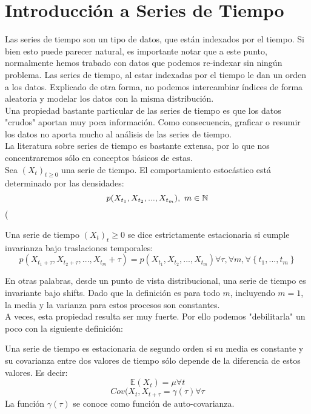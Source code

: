 \chapter{Introducción a Series de Tiempo}

Las series de tiempo son un tipo de datos, que están indexados por el tiempo. Si bien esto puede parecer natural, es importante notar que a este punto, normalmente hemos trabado con datos que podemos re-indexar sin ningún problema. Las series de tiempo, al estar indexadas por el tiempo le dan un orden a los datos. Explicado de otra forma, no podemos intercambiar índices de forma aleatoria y modelar los datos con la misma distribución. \\
Una propiedad bastante particular de las series de tiempo es que los datos "crudos" aportan muy poca información. Como consecuencia, graficar o resumir los datos no aporta mucho al análisis de las series de tiempo. \\
La literatura sobre series de tiempo es bastante extensa, por lo que nos concentraremos sólo en conceptos básicos de estas. \\
Sea $(X_t)_{t \geq 0}$ una serie de tiempo. El comportamiento estocástico está determinado por las densidades: 
$$
p(X_{t_1},X_{t_2},...,X_{t_m}), \text{  } m \in {\mathbb N}
$$
(\begin{definition}
Una serie de tiempo $(X_t)_t\geq 0$ se dice estrictamente estacionaria si cumple invarianza bajo traslaciones temporales:
$$
p(X_{t_1+\tau},X_{t_2+\tau},...,X_{t_m}+\tau)=p(X_{t_1},X_{t_2},...,X_{t_m}) \forall \tau, \forall m, \forall \left \{ t_1,...,t_m \right \}
$$
\end{definition}

En otras palabras, desde un punto de vista distribucional, una serie de tiempo es invariante bajo shifts. Dado que la definición es para todo $m$, incluyendo $m=1$, la media y la varianza para estos procesos son constantes. \\
A veces, esta propiedad resulta ser muy fuerte. Por ello podemos "debilitarla" un poco con la siguiente definición: 
 \begin{definition}
 Una serie de tiempo es estacionaria de segundo orden si su media es constante y su covarianza entre dos valores de tiempo sólo depende de la diferencia de estos valores. Es decir:
 $$
 \mathbb{E}(X_t)=\mu \forall t
 $$
 $$
 Cov(X_t,X_{t+\tau}=\gamma(\tau) \forall \tau
 $$
La función $\gamma(\tau)$ se conoce como función de auto-covarianza. 
 \end{definition}
 

